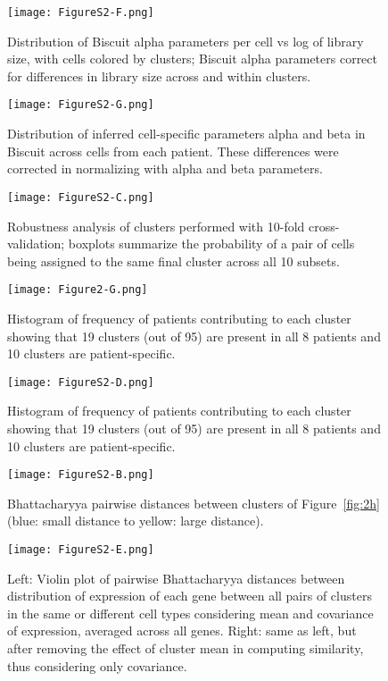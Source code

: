 \begin{figure}
\centering
\texttt{[image: FigureS2-F.png]}
\caption{Distribution of Biscuit alpha parameters per cell vs log of library size, with cells colored by clusters; Biscuit alpha parameters correct for differences in library size across and within clusters.
}
\label{fig:s2f}
\end{figure}

\begin{figure}
\centering
\texttt{[image: FigureS2-G.png]}
\caption{Distribution of inferred cell-specific parameters alpha and beta in Biscuit across cells from each patient. These differences were corrected in normalizing with alpha and beta parameters.
}
\label{fig:s2g}
\end{figure}

\begin{figure}
\centering
\texttt{[image: FigureS2-C.png]}
\caption{Robustness analysis of clusters performed with 10-fold cross-validation; boxplots summarize the probability of a pair of cells being assigned to the same final cluster across all 10 subsets.
}
\label{fig:s2c}
\end{figure}

\begin{figure}
\centering
\texttt{[image: Figure2-G.png]}
\caption{Histogram of frequency of patients contributing to each cluster showing that 19 clusters (out of 95) are present in all 8 patients and 10 clusters are patient-specific.
}
\label{fig:2g}
\end{figure}

\begin{figure}
\centering
\texttt{[image: FigureS2-D.png]}
\caption{Histogram of frequency of patients contributing to each cluster showing that 19 clusters (out of 95) are present in all 8 patients and 10 clusters are patient-specific.
}
\label{fig:s2d}
\end{figure}

\begin{figure}
\centering
\texttt{[image: FigureS2-B.png]}
\caption{Bhattacharyya pairwise distances between clusters of Figure~\ref{fig:2h} (blue: small distance to yellow: large distance).
}
\label{fig:s2b}
\end{figure}


\begin{figure}
\centering
\texttt{[image: FigureS2-E.png]}
\caption{Left: Violin plot of pairwise Bhattacharyya distances between distribution of expression of each gene between all pairs of clusters in the same or different cell types considering mean and covariance of expression, averaged across all genes.
Right: same as left, but after removing the effect of cluster mean in computing similarity, thus considering only covariance.
}
\label{fig:s2e}
\end{figure}

